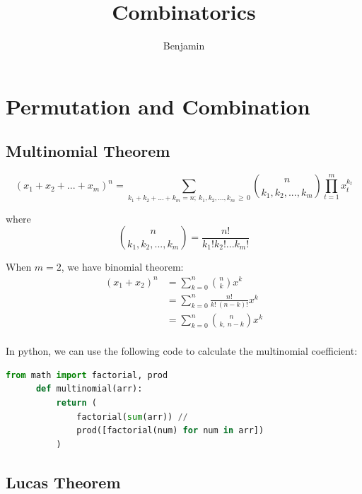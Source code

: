 \documentclass{article}
\title{Combinatorics}
\author{Benjamin}
\date{}
\begin{document}
\maketitle

\section{Permutation and Combination}
  \subsection{Multinomial Theorem}
    \begin{equation*}
      (x_1 + x_2 + ... + x_m)^n = 
      \sum_{k_1 + k_2 + ... + k_m = n; \: k_1, k_2, ..., k_m \,\geq\, 0}
      \binom{n}{k_1, k_2, ..., k_m} \prod_{t = 1}^{m} x_t^{k_t}
    \end{equation*}

    where
    \begin{equation*}
      \binom{n}{k_1, k_2, ..., k_m} = \frac{n!}{k_1! k_2! ... k_m!}
    \end{equation*}

    \bigskip
    
    When $m = 2$, we have binomial theorem:
    \begin{equation*}
      \begin{aligned}
        (x_1 + x_2)^n & = \sum_{k = 0}^{n} \binom{n}{k} x^k \\
                      & = \sum_{k = 0}^{n} \frac{n!}{k! \: (n-k)!} x^k \\
                      & = \sum_{k = 0}^{n} \binom{n}{k, \: n-k} x^k \\
      \end{aligned}
    \end{equation*}

    \bigskip

    In python, we can use the following code to calculate the multinomial coefficient:
    \begin{lstlisting}[language=Python, basicstyle=\small]
      from math import factorial, prod
      def multinomial(arr):
          return (
              factorial(sum(arr)) // 
              prod([factorial(num) for num in arr])
          )
    \end{lstlisting}
  \subsection{Lucas Theorem}
\end{document}

